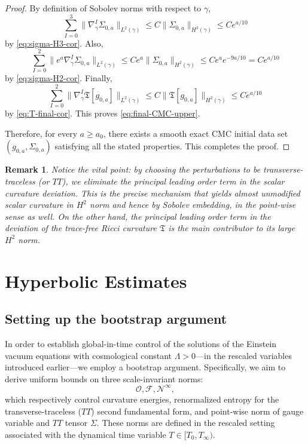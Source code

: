 \documentclass{amsart}
\newtheorem{remark}{Remark}
\begin{document}
\begin{proof}
\medskip

\noindent
By definition of Sobolev norms with respect to \(\gamma\),
\[
\sum_{I=0}^{3}\|\nabla_{\gamma}^{I}\Sigma_{0,a}\|_{L^{2}(\gamma)}
\le C \|\Sigma_{0,a}\|_{H^{3}(\gamma)}
\le C e^{a/10}
\]
by \eqref{eq:sigma-H3-cor}. Also,
\[
\sum_{I=0}^{2}\|e^{a}\nabla_{\gamma}^{I}\Sigma_{0,a}\|_{L^{2}(\gamma)}
\le C e^{a}\|\Sigma_{0,a}\|_{H^{2}(\gamma)}
\le C e^{a}e^{-9a/10}
= C e^{a/10}
\]
by \eqref{eq:sigma-H2-cor}. Finally,
\[
\sum_{I=0}^{2}\|\nabla_{\gamma}^{I}\mathfrak T[g_{0,a}]\|_{L^{2}(\gamma)}
\le C \|\mathfrak T[g_{0,a}]\|_{H^{2}(\gamma)}
\le C e^{a/10}
\]
by \eqref{eq:T-final-cor}. This proves \eqref{eq:final-CMC-upper}.

\noindent Therefore, for every \(a\ge a_{0}\), there exists a smooth exact CMC initial data set \((g_{0,a},\Sigma_{0,a})\) satisfying all the stated properties. This completes the proof.
\end{proof}


\begin{remark}
 Notice the vital point: by choosing the perturbations to be transverse-traceless (or $TT$), we eliminate the principal leading order term in the scalar curvature deviation. This is the precise mechanism that yields almost unmodified scalar curvature in $H^{2}$ norm and hence by Sobolev embedding, in the point-wise sense as well. On the other hand, the principal leading order term in the deviation of the trace-free Ricci curvature $\mathfrak{T}$ is the main contributor to its large   $H^{2}$ norm.
\end{remark}



\section{Hyperbolic Estimates}

\subsection{Setting up the bootstrap argument}
\label{bootstrapargument}
\noindent In order to establish global-in-time control of the solutions of the Einstein vacuum equations with cosmological constant $\Lambda>0$—in the rescaled variables introduced earlier—we employ a bootstrap argument. Specifically, we aim to derive uniform bounds on three scale-invariant norms:
\[
\mathcal{O}, \mathcal{F}, \mathcal{N}^\infty,
\]
which respectively control curvature energies, renormalized entropy for the transverse-traceless ($TT$) second fundamental form, and point-wise norm of gauge variable and $TT$ tensor $\Sigma$. These norms are defined in the rescaled setting associated with the dynamical time variable $T \in [T_0, T_\infty)$.
\end{document}
